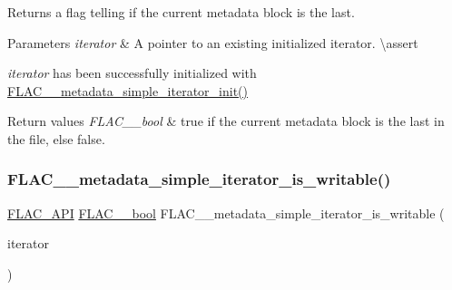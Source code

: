 Returns a flag telling if the current metadata block is the last.


\begin{DoxyParams}{Parameters}
{\em iterator} & A pointer to an existing initialized iterator. \textbackslash{}assert 
\begin{DoxyCode}{1}
\end{DoxyCode}
 {\itshape iterator} has been successfully initialized with \mbox{\hyperlink{group__flac__metadata__level1_ga2a055cca4e6e06ae62517c8b0fa6e8a3}{F\+L\+A\+C\+\_\+\+\_\+metadata\+\_\+simple\+\_\+iterator\+\_\+init()}} \\
\hline
\end{DoxyParams}

\begin{DoxyRetVals}{Return values}
{\em F\+L\+A\+C\+\_\+\+\_\+bool} & {\ttfamily true} if the current metadata block is the last in the file, else {\ttfamily false}. \\
\hline
\end{DoxyRetVals}
\mbox{\label{group__flac__metadata__level1_gadc654c1361b53737bab20efa3e75a0fc}} 
\subsubsection{\texorpdfstring{FLAC\_\_metadata\_simple\_iterator\_is\_writable()}{FLAC\_\_metadata\_simple\_iterator\_is\_writable()}}
{\footnotesize\ttfamily \mbox{\hyperlink{group__flac__export_ga56ca07df8a23310707732b1c0007d6f5}{F\+L\+A\+C\+\_\+\+A\+PI}} \mbox{\hyperlink{ordinals_8h_a95103469f1cbd78b8cf250194985b34e}{F\+L\+A\+C\+\_\+\+\_\+bool}} F\+L\+A\+C\+\_\+\+\_\+metadata\+\_\+simple\+\_\+iterator\+\_\+is\+\_\+writable (\begin{DoxyParamCaption}\item[{const \mbox{\hyperlink{group__flac__metadata__level1_ga6accccddbb867dfc2eece9ee3ffecb3a}{F\+L\+A\+C\+\_\+\+\_\+\+Metadata\+\_\+\+Simple\+Iterator}} $\ast$}]{iterator }\end{DoxyParamCaption})}

